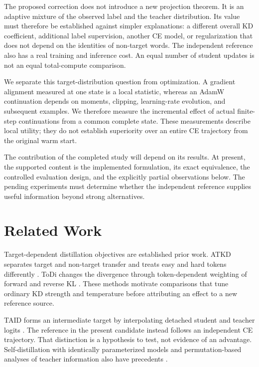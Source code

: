\documentclass[11pt]{article}
\begin{document}
The proposed correction does not introduce a new projection theorem. It is
an adaptive mixture of the observed label and the teacher distribution. Its
value must therefore be established against simpler explanations: a different
overall KD coefficient, additional label supervision, another CE model, or
regularization that does not depend on the identities of non-target words.
The independent reference also has a real training and inference cost. An
equal number of student updates is not an equal total-compute comparison.

We separate this target-distribution question from optimization. A gradient
alignment measured at one state is a local statistic, whereas an AdamW
continuation depends on moments, clipping, learning-rate evolution, and
subsequent examples. We therefore measure the incremental effect of actual
finite-step continuations from a common complete state. These measurements
describe local utility; they do not establish superiority over an entire
CE trajectory from the original warm start.

The contribution of the completed study will depend on its results. At
present, the supported content is the implemented formulation, its exact
equivalence, the controlled evaluation design, and the explicitly partial
observations below. The pending experiments must determine whether the
independent reference supplies useful information beyond strong alternatives.

\section{Related Work}
Target-dependent distillation objectives are established prior work.
ATKD separates target and non-target transfer and treats easy and hard
tokens differently \citep{zhong-etal-2024-revisiting}. ToDi changes the
divergence through token-dependent weighting of forward and reverse KL
\citep{jung-etal-2025-todi}. These methods motivate comparisons that tune
ordinary KD strength and temperature before attributing an effect to a new
reference source.

TAID forms an intermediate target by interpolating detached student and
teacher logits \citep{shing2025taidtemporallyadaptiveinterpolated}. The
reference in the present candidate instead follows an independent CE
trajectory. That distinction is a hypothesis to test, not evidence of an
advantage. Self-distillation with identically parameterized models and
permutation-based analyses of teacher information also have precedents
\citep{furlanello2018bornneuralnetworks}.
\end{document}

